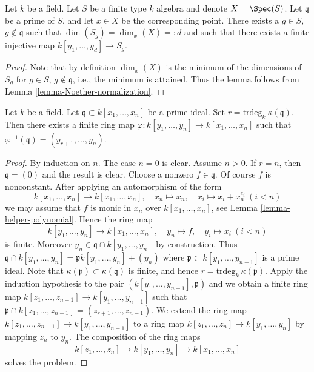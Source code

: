 \begin{lemma}
\label{lemma-Noether-normalization-at-point}
Let $k$ be a field.
Let $S$ be a finite type $k$ algebra and denote $X = \Spec(S)$.
Let $\mathfrak q$ be a prime of $S$, and let $x \in X$ be the
corresponding point. There exists a $g \in S$, $g \not \in \mathfrak q$
such that $\dim(S_g) = \dim_x(X) =: d$ and such that
there exists a finite injective map $k[y_1, \ldots, y_d] \to S_g$.
\end{lemma}

\begin{proof}
Note that by definition $\dim_x(X)$ is the minimum
of the dimensions of $S_g$ for $g \in S$, $g \not \in \mathfrak q$, i.e.,
the minimum is attained. Thus the lemma follows from
Lemma \ref{lemma-Noether-normalization}.
\end{proof}

\begin{lemma}
\label{lemma-refined-Noether-normalization}
Let $k$ be a field. Let $\mathfrak q \subset k[x_1, \ldots, x_n]$
be a prime ideal. Set $r = \text{trdeg}_k\ \kappa(\mathfrak q)$.
Then there exists a finite ring map
$\varphi : k[y_1, \ldots, y_n] \to k[x_1, \ldots, x_n]$ such
that $\varphi^{-1}(\mathfrak q) = (y_{r + 1}, \ldots, y_n)$.
\end{lemma}

\begin{proof}
By induction on $n$. The case $n = 0$ is clear. Assume $n > 0$.
If $r = n$, then $\mathfrak q = (0)$ and the result is clear.
Choose a nonzero $f \in \mathfrak q$. Of course $f$ is nonconstant.
After applying an automorphism of the form
$$
k[x_1, \ldots, x_n] \longrightarrow k[x_1, \ldots, x_n],
\quad
x_n \mapsto x_n,
\quad
x_i \mapsto x_i + x_n^{e_i}\ (i < n)
$$
we may assume that $f$ is monic in $x_n$ over $k[x_1, \ldots, x_n]$, see
Lemma \ref{lemma-helper-polynomial}. Hence the ring map
$$
k[y_1, \ldots, y_n] \longrightarrow k[x_1, \ldots, x_n],
\quad
y_n \mapsto f,
\quad
y_i \mapsto x_i\ (i < n)
$$
is finite. Moreover $y_n \in \mathfrak q \cap k[y_1, \ldots, y_n]$ by
construction. Thus
$\mathfrak q \cap k[y_1, \ldots, y_n] = \mathfrak pk[y_1, \ldots, y_n] + (y_n)$
where $\mathfrak p \subset k[y_1, \ldots, y_{n - 1}]$ is a prime ideal.
Note that $\kappa(\mathfrak p) \subset \kappa(\mathfrak q)$ is finite, and
hence $r = \text{trdeg}_k\ \kappa(\mathfrak p)$.
Apply the induction hypothesis to the pair
$(k[y_1, \ldots, y_{n - 1}], \mathfrak p)$ and we obtain a finite ring map
$k[z_1, \ldots, z_{n - 1}] \to k[y_1, \ldots, y_{n - 1}]$ such that
$\mathfrak p \cap k[z_1, \ldots, z_{n - 1}] = (z_{r + 1}, \ldots, z_{n - 1})$.
We extend the ring map
$k[z_1, \ldots, z_{n - 1}] \to k[y_1, \ldots, y_{n - 1}]$
to a ring map
$k[z_1, \ldots, z_n] \to k[y_1, \ldots, y_n]$
by mapping $z_n$ to $y_n$.
The composition of the ring maps
$$
k[z_1, \ldots, z_n] \to k[y_1, \ldots, y_n] \to k[x_1, \ldots, x_n]
$$
solves the problem.
\end{proof}

